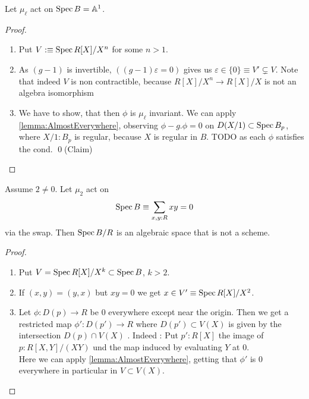 \begin{example}
	Let $\mu_\ell$ act on $\operatorname{Spec} B = \mathbb{A}^1$.
\end{example}
\begin{proof}
	\begin{enumerate}
		\item Put $ V:\equiv\operatorname{Spec} R[X] / X^n$ for some $n >1$.
		\item As $(g-1)$ is invertible, $ ((g-1)\varepsilon = 0) $  gives us $\varepsilon \in \{0\} \equiv V' \subsetneq V$. Note that indeed $V$ is non contractible, because $R[X] / X^n \to R[X] / X$ is not an algebra isomorphism
		\item 	We have to show, that then $\phi$ is $\mu_{\ell}$ invariant. We can apply  \ref{lemma:AlmostEverywhere}, observing $\phi - g.\phi = 0$ on $D(X / 1) \subset \operatorname{Spec} B_p$, where $X/1 : B_p$ is regular, because $X$ is regular in $B$. TODO as each $\phi$ satisfies the cond. \qed(Claim)\\
	
	\end{enumerate}
\end{proof}
\begin{example}
	Assume $2 \neq 0$. Let $\mu_2$ act on
	\[
	\operatorname{Spec} B \equiv \sum_{x , y : R} x y = 0
	\]
	via the swap. Then $\operatorname{Spec} B / R$ is an algebraic space that is not a scheme.
\end{example}
\begin{proof}
	\begin{enumerate}
		\item Put $V = \operatorname{Spec} R[X] / X^k \subset \operatorname{Spec} B$, $k > 2$.
		\item If $(x,y) = (y,x)$ but $x y = 0$ we get $x \in V' \equiv \operatorname{Spec} R[X] / X^2$.
		\item Let $\phi: D(p) \to R$ be 0 everywhere except near the origin. Then we get a restricted map $\phi' : D(p') \to R$ where $D(p') \subset V(X)$ is given by the intersection $D(p) \cap V(X) $ . Indeed : Put $p' : R[X]$ the image of $p : R[X,Y] / (XY)$ und the map induced by evaluating $Y$ at 0. \\
		Here we can apply \ref{lemma:AlmostEverywhere}, getting that $\phi'$ is 0 everywhere in particular in $V \subset V(X)$.
	\end{enumerate}
\end{proof}
